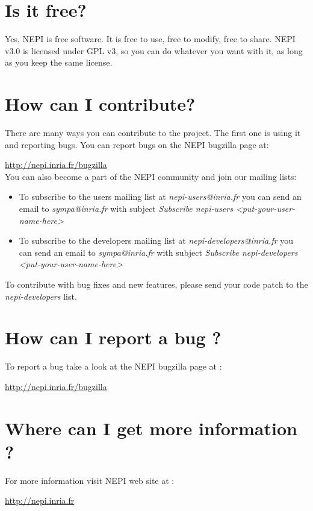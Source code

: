 \section{Is it free?}

Yes, NEPI is free software. It is free to use, free to modify, free to share.
NEPI v3.0 is licensed under GPL v3, so you can do whatever you want with it, 
as long as you keep the same license. 

\section{How can I contribute?}

There are many ways you can contribute to the project. 
The first one is using it and reporting bugs. 
You can report bugs on the NEPI bugzilla page at: 

\url{http://nepi.inria.fr/bugzilla} \\

You can also become a part of the NEPI community and join our mailing lists:

\begin{itemize}
    \item To subscribe to the users mailing list at \textit{nepi-users@inria.fr}
        you can send an email to \textit{sympa@inria.fr} with subject
        \textit{Subscribe nepi-users <put-your-user-name-here>}
    \item To subscribe to the developers mailing list at \textit{nepi-developers@inria.fr}
        you can send an email to \textit{sympa@inria.fr} with subject
        \textit{Subscribe nepi-developers <put-your-user-name-here>}
    \end{itemize}

To contribute with bug fixes and new features, please send your code patch
to the \textit{nepi-developers} list.

\section{How can I report a bug ?}

To report a bug take a look at the NEPI bugzilla page at :

\url{http://nepi.inria.fr/bugzilla} \\

\section{Where can I get more information ?}

For more information visit NEPI web site at :

\url{http://nepi.inria.fr} \\


